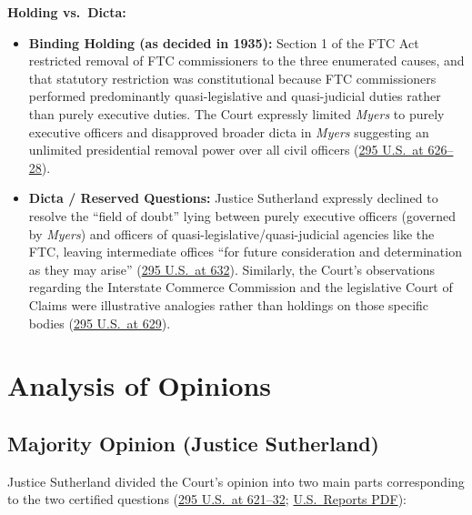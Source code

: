 \documentclass[12pt]{article}
\begin{document}
\textbf{Holding vs.\ Dicta:}
\begin{itemize}
    \item \textbf{Binding Holding (as decided in 1935):} Section 1 of the FTC Act restricted removal of FTC commissioners to the three enumerated causes, and that statutory restriction was constitutional because FTC commissioners performed predominantly quasi-legislative and quasi-judicial duties rather than purely executive duties. The Court expressly limited \textit{Myers} to purely executive officers and disapproved broader dicta in \textit{Myers} suggesting an unlimited presidential removal power over all civil officers (\href{https://supreme.justia.com/cases/federal/us/295/602/}{295 U.S.\ at 626--28}).
    \item \textbf{Dicta / Reserved Questions:} Justice Sutherland expressly declined to resolve the ``field of doubt'' lying between purely executive officers (governed by \textit{Myers}) and officers of quasi-legislative/quasi-judicial agencies like the FTC, leaving intermediate offices ``for future consideration and determination as they may arise'' (\href{https://supreme.justia.com/cases/federal/us/295/602/}{295 U.S.\ at 632}). Similarly, the Court's observations regarding the Interstate Commerce Commission and the legislative Court of Claims were illustrative analogies rather than holdings on those specific bodies (\href{https://supreme.justia.com/cases/federal/us/295/602/}{295 U.S.\ at 629}).
\end{itemize}

\section{Analysis of Opinions}

\subsection{Majority Opinion (Justice Sutherland)}

Justice Sutherland divided the Court's opinion into two main parts corresponding to the two certified questions (\href{https://supreme.justia.com/cases/federal/us/295/602/}{295 U.S.\ at 621--32}; \href{https://tile.loc.gov/storage-services/service/ll/usrep/usrep295/usrep295602/usrep295602.pdf}{U.S.\ Reports PDF}):
\end{document}
